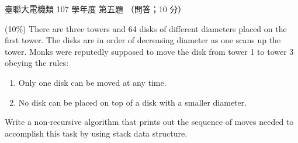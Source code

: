 \begin{pastexam}[label={px:ust-107-ee-ds-05}]{臺聯大電機類 107 學年度 第五題}
（問答；10 分）

(10\%) There are three towers and 64 disks of different diameters placed on the first tower. The disks are in order of decreasing diameter as one scans up the tower. Monks were reputedly supposed to move the disk from tower 1 to tower 3 obeying the rules:
\begin{enumerate}[label=(\roman*)]
\item Only one disk can be moved at any time.
\item No disk can be placed on top of a disk with a smaller diameter.
\end{enumerate}
Write a non-recursive algorithm that prints out the sequence of moves needed to accomplish this task by using stack data structure.
\end{pastexam}

